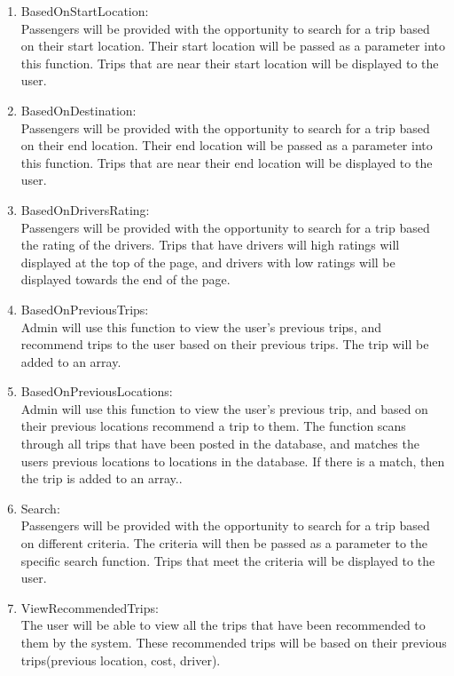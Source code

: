 \documentclass[hidelinks, 12pt, a4paper]{article}
\begin{document}
\begin{enumerate}[label=U1.\arabic*]

      \item BasedOnStartLocation:\\
            Passengers will be provided with the opportunity to search for a trip based on their start location. Their start location  will be passed as a parameter into this function. Trips that are near their start location will be displayed to the user.\\

      \item BasedOnDestination:\\
            Passengers will be provided with the opportunity to search for a trip based on their end  location. Their end  location  will be passed as a parameter into this function. Trips that are near their end location will be displayed to the user.\\
        

      \item BasedOnDriversRating:\\
            Passengers will be provided with the opportunity to search for a trip based the rating of the drivers. Trips that have drivers will high ratings will displayed at the top of the page, and drivers with low ratings will be displayed towards the end of the page.\\

      \item BasedOnPreviousTrips:\\
            Admin will use this function to view the user’s previous trips, and recommend trips to the user based on their previous trips. The trip will be added to an array.\\

      \item BasedOnPreviousLocations: \\
            Admin will use this function to view the user’s previous trip, and based on their previous locations recommend a trip to them. The function scans through all trips that have been posted in the database, and matches the users  previous locations to locations in the database. If there is a match, then the trip is added to an array..\\

      \item Search:\\
            Passengers will be provided with the opportunity to search for a trip based on different criteria. The criteria will then be passed as a parameter to the specific search function. Trips that meet the criteria will be displayed to the user.\\

      \item ViewRecommendedTrips:\\
            The user will be able to view all the trips that have been recommended to them by the system. These recommended trips will be based on their previous trips(previous location, cost, driver). \\

\end{enumerate}
\end{document}
